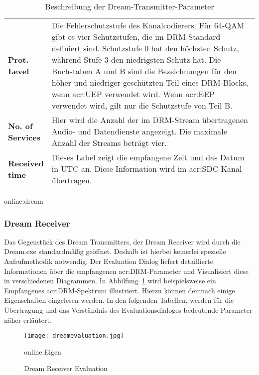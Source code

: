\begin{table}[H]
\begin{center}
\begin{tabular}{p{0.17\linewidth}  p{0.83\linewidth}}
			\textbf{Prot. Level} & Die Fehlerschutzstufe des Kanalcodierers. Für 64-QAM gibt es vier Schutzstufen, die im DRM-Standard definiert sind. Schutzstufe 0 hat den höchsten Schutz, während Stufe 3 den niedrigsten Schutz hat. Die Buchstaben A und B sind die Bezeichnungen für den höher und niedriger geschützten Teil eines DRM-Blocks, wenn \gls{acr:UEP} verwendet wird. Wenn \gls{acr:EEP} verwendet wird, gilt nur die Schutzstufe von Teil B.\\
		
			\textbf{No. of Services} & Hier wird die Anzahl der im DRM-Stream übertragenen Audio- und Datendienste angezeigt. Die maximale Anzahl der Streams beträgt vier.\\
		
			\textbf{Received time} & Dieses Label zeigt die empfangene Zeit und das Datum in UTC an. Diese Information wird im \gls{acr:SDC}-Kanal übertragen.\\
			\bottomrule
		\end{tabular}
		\caption{Beschreibung der Dream-Transmitter-Parameter}\gls{online:dream}
		\label{tab:dreamparam}
	\end{center}
\end{table}

\newpage
\subsubsection{Dream Receiver}
\label{subsec:Unterabschnitt12}

Das Gegenstück des Dream Transmitters, der Dream Receiver wird durch die Dream.exe standardmäßig geöffnet. Deshalb ist hierbei keinerlei spezielle Aufrufmethodik notwendig. Der Evaluation Dialog liefert detaillierte Informationen über die empfangenen \gls{acr:DRM}-Parameter und Visualisiert diese in verschiedenen Diagrammen. In Abbilfung~\ref{fig:dreamevaluation} wird beispielsweise ein Empfangenes \gls{acr:DRM}-Spektrum illustriert. Hierzu können demnach einige Eigenschaften eingelesen werden. In den folgenden Tabellen, werden für die Übertragung und das Verständnis des Evaluationsdialoges bedeutende Parameter näher erläutert.


\begin{figure}[H]
	\centering
	\texttt{[image: dreamevaluation.jpg]}
	\caption[Dream Receiver Evaluation]{Dream Receiver Evaluation}\gls{online:Eigen}
	\label{fig:dreamevaluation}
\end{figure}




